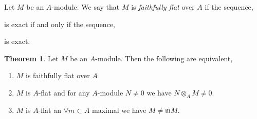\documentclass[12pt]{article}
\newcommand{\m}{\mathfrak{m}}
\theoremstyle{remark}
\theoremstyle{definition}
\newtheorem{theorem}{Theorem}[section]
\newenvironment{definition}[1][Definition:]{\begin{trivlist}
\item[\hskip \labelsep {\bfseries #1}]}{\end{trivlist}}
\begin{document}
\begin{definition}
Let $M$ be an $A$-module. We say that $M$ is \textit{faithfully flat} over $A$ if the sequence,
\begin{center}
\end{center}
is exact if and only if the sequence,
\begin{center}
\end{center}
is exact.  
\end{definition}

\begin{theorem}
Let $M$ be an $A$-module. Then the following are equivalent,
\begin{enumerate}
\item $M$ is faithfully flat over $A$
\item $M$ is $A$-flat and for any $A$-module $N \neq 0$ we have $N \otimes_A M \neq 0$. 
\item $M$ is $A$-flat an $\forall m \subset A$ maximal we have $M \neq \m M$. 
\end{enumerate}
\end{theorem}
\end{document}
